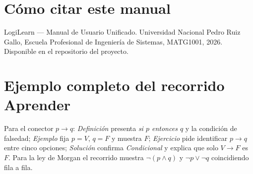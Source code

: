 \documentclass[11pt,a4paper,openany]{book}
\begin{document}
\section{C\'omo citar este manual}
LogiLearn --- Manual de Usuario Unificado. Universidad Nacional Pedro Ruiz Gallo, Escuela Profesional de Ingenier\'ia de Sistemas, MATG1001, 2026. Disponible en el repositorio del proyecto.
\section{Ejemplo completo del recorrido Aprender}
Para el conector $p \to q$: \textit{Definici\'on} presenta \textit{si $p$ entonces $q$} y la condici\'on de falsedad; \textit{Ejemplo} fija $p = V$, $q = F$ y muestra $F$; \textit{Ejercicio} pide identificar $p \to q$ entre cinco opciones; \textit{Soluci\'on} confirma \textit{Condicional} y explica que solo $V \to F$ es $F$. Para la ley de Morgan el recorrido muestra $\lnot(p \land q)$ y $\lnot p \lor \lnot q$ coincidiendo fila a fila.
\end{document}
